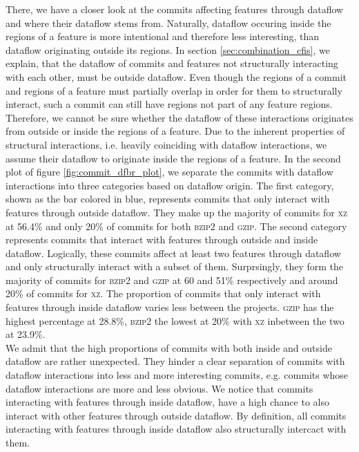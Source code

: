 There, we have a closer look at the commits affecting features through dataflow and where their dataflow stems from.
Naturally, dataflow occuring inside the regions of a feature is more intentional and therefore less interesting, than dataflow originating outside its regions.
In section \ref{sec:combination_cfis}, we explain, that the dataflow of commits and features not structurally interacting with each other, must be outside dataflow.
Even though the regions of a commit and regions of a feature must partially overlap in order for them to structurally interact, such a commit can still have regions not part of any feature regions.
Therefore, we cannot be sure whether the dataflow of these interactions originates from outside or inside the regions of a feature.
Due to the inherent properties of structural interactions, i.e. heavily coinciding with dataflow interactions, we assume their dataflow to originate inside the regions of a feature.
In the second plot of figure \ref{fig:commit_dfbr_plot}, we separate the commits with dataflow interactions into three categories based on dataflow origin.
The first category, shown as the bar colored in blue, represents commits that only interact with features through outside dataflow.
They make up the majority of commits for \textsc{xz} at 56.4\% and only 20\% of commits for both \textsc{bzip2} and \textsc{gzip}.
The second category represents commits that interact with features through outside and inside dataflow.
Logically, these commits affect at least two features through dataflow and only structurally interact with a subset of them.
Surprsingly, they form the majority of commits for \textsc{bzip2} and \textsc{gzip} at 60 and 51\% respectively and around 20\% of commits for \textsc{xz}.
The proportion of commits that only interact with features through inside dataflow varies less between the projects.
\textsc{gzip} has the highest percentage at 28.8\%, \textsc{bzip2} the lowest at 20\% with \textsc{xz} inbetween the two at 23.9\%. \\
We admit that the high proportions of commits with both inside and outside dataflow are rather unexpected.
They hinder a clear separation of commits with dataflow interactions into less and more interesting commits, e.g. commits whose dataflow interactions are more and less obvious.
We notice that commits interacting with features through inside dataflow, have a high chance to also interact with other features through outside dataflow.
By definition, all commits interacting with features through inside dataflow also structurally intercact with them.
